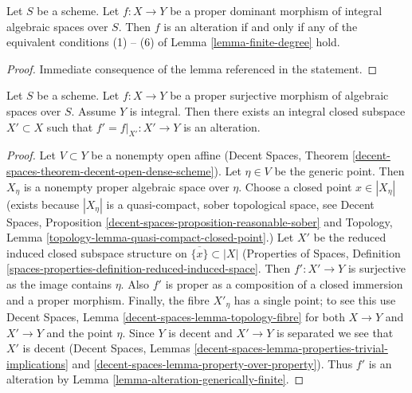 \begin{lemma}
\label{lemma-alteration-generically-finite}
Let $S$ be a scheme. Let $f : X \to Y$ be a proper dominant morphism of
integral algebraic spaces over $S$. Then $f$ is an alteration
if and only if any of the equivalent conditions (1) -- (6) of
Lemma \ref{lemma-finite-degree} hold.
\end{lemma}

\begin{proof}
Immediate consequence of the lemma referenced in the statement.
\end{proof}

\begin{lemma}
\label{lemma-alteration-contained-in}
Let $S$ be a scheme. Let $f : X \to Y$ be a proper surjective morphism of
algebraic spaces over $S$. Assume $Y$ is integral. Then
there exists an integral closed subspace $X' \subset X$ such that
$f' = f|_{X'} : X' \to Y$ is an alteration.
\end{lemma}

\begin{proof}
Let $V \subset Y$ be a nonempty open affine
(Decent Spaces, Theorem \ref{decent-spaces-theorem-decent-open-dense-scheme}).
Let $\eta \in V$ be the generic point. Then
$X_\eta$ is a nonempty proper algebraic space over $\eta$.
Choose a closed point $x \in |X_\eta|$
(exists because $|X_\eta|$ is a quasi-compact, sober
topological space, see Decent Spaces, Proposition
\ref{decent-spaces-proposition-reasonable-sober}
and Topology, Lemma \ref{topology-lemma-quasi-compact-closed-point}.)
Let $X'$ be the reduced induced closed subspace structure on
$\overline{\{x\}} \subset |X|$ (Properties of Spaces, Definition
\ref{spaces-properties-definition-reduced-induced-space}.
Then $f' : X' \to Y$ is surjective as the image contains $\eta$.
Also $f'$ is proper as a composition of a closed immersion
and a proper morphism. Finally, the fibre $X'_\eta$ has a
single point; to see this use
Decent Spaces, Lemma \ref{decent-spaces-lemma-topology-fibre}
for both $X \to Y$ and $X' \to Y$ and the point $\eta$.
Since $Y$ is decent and $X' \to Y$ is separated we see that $X'$ is decent
(Decent Spaces, Lemmas
\ref{decent-spaces-lemma-properties-trivial-implications} and
\ref{decent-spaces-lemma-property-over-property}).
Thus $f'$ is an alteration by
Lemma \ref{lemma-alteration-generically-finite}.
\end{proof}








